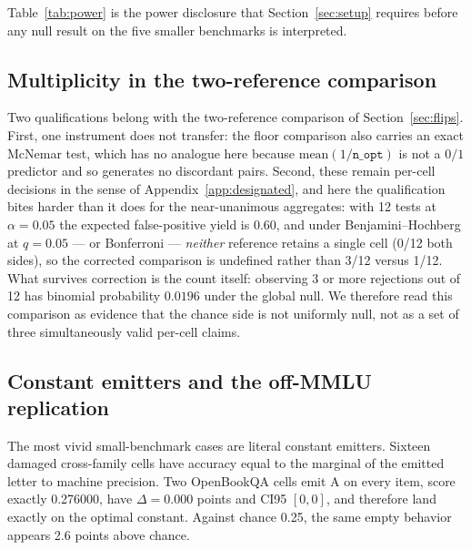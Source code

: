 Table~\ref{tab:power} is the power disclosure that Section~\ref{sec:setup} requires before any null result on the five smaller benchmarks is interpreted.



\FloatBarrier

\subsection{Multiplicity in the two-reference comparison}
\label{app:analysis-mult}

Two qualifications belong with the two-reference comparison of Section~\ref{sec:flips}. First, one instrument does not transfer: the floor comparison also carries an exact McNemar test, which has no analogue here because $\mathrm{mean}(1/\texttt{n\_opt})$ is not a $0/1$ predictor and so generates no discordant pairs. Second, these remain per-cell decisions in the sense of Appendix~\ref{app:designated}, and here the qualification bites harder than it does for the near-unanimous aggregates: with 12 tests at $\alpha=0.05$ the expected false-positive yield is $0.60$, and under Benjamini--Hochberg at $q=0.05$ --- or Bonferroni --- \emph{neither} reference retains a single cell (0/12 both sides), so the corrected comparison is undefined rather than 3/12 versus 1/12. What survives correction is the count itself: observing 3 or more rejections out of 12 has binomial probability $0.0196$ under the global null. We therefore read this comparison as evidence that the chance side is not uniformly null, not as a set of three simultaneously valid per-cell claims.

\subsection{Constant emitters and the off-MMLU replication}
\label{app:offmmlu}

The most vivid small-benchmark cases are literal constant emitters. Sixteen damaged cross-family cells have accuracy equal to the marginal of the emitted letter to machine precision. Two OpenBookQA cells emit A on every item, score exactly 0.276000, have $\Delta=0.000$ points and CI95 $[0,0]$, and therefore land exactly on the optimal constant. Against chance 0.25, the same empty behavior appears 2.6 points above chance.

